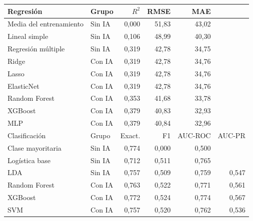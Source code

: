 \begin{tabular}{@{}llrrrr@{}}
\toprule
Regresión & Grupo & $R^2$ & RMSE & MAE &  \\
\midrule
Media del entrenamiento & Sin IA & 0,000 & 51,83 & 43,02 &  \\
Lineal simple & Sin IA & 0,106 & 48,99 & 40,30 &  \\
Regresión múltiple & Sin IA & 0,319 & 42,78 & 34,75 &  \\
Ridge & Con IA & 0,319 & 42,78 & 34,76 &  \\
Lasso & Con IA & 0,319 & 42,78 & 34,76 &  \\
ElasticNet & Con IA & 0,319 & 42,78 & 34,76 &  \\
Random Forest & Con IA & 0,353 & 41,68 & 33,78 &  \\
XGBoost & Con IA & 0,379 & 40,83 & 32,93 &  \\
MLP & Con IA & 0,379 & 40,84 & 32,96 &  \\
\midrule
Clasificación & Grupo & Exact. & F1 & AUC-ROC & AUC-PR \\
\midrule
Clase mayoritaria & Sin IA & 0,774 & 0,000 & 0,500 &  \\
Logística base & Sin IA & 0,712 & 0,511 & 0,765 &  \\
LDA & Sin IA & 0,757 & 0,509 & 0,759 & 0,547 \\
Random Forest & Con IA & 0,763 & 0,522 & 0,771 & 0,561 \\
XGBoost & Con IA & 0,772 & 0,524 & 0,774 & 0,567 \\
SVM & Con IA & 0,757 & 0,520 & 0,762 & 0,536 \\
\bottomrule
\end{tabular}
